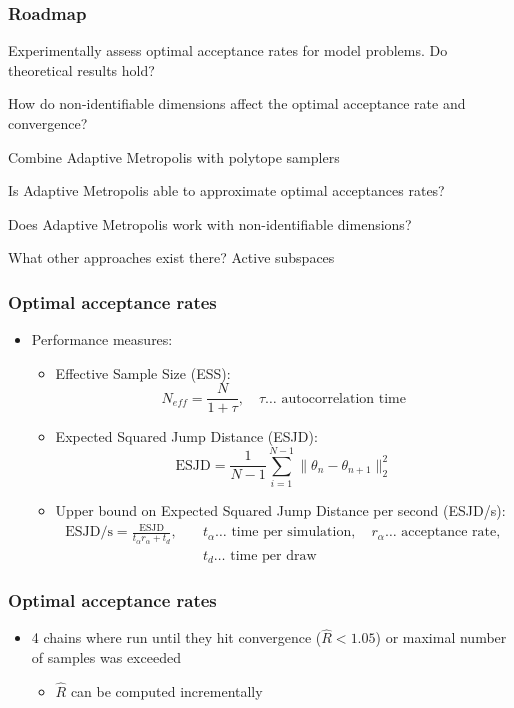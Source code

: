\begin{frame}[c]
    \frametitle{Roadmap}
    \begin{itemize}
	\item Experimentally assess optimal acceptance rates for model problems. Do theoretical results hold?
        {\color{lgray}
	\item How do non-identifiable dimensions affect the optimal acceptance rate and convergence?
	\item Combine Adaptive Metropolis with polytope samplers
	\item Is Adaptive Metropolis able to approximate optimal acceptances rates? 
	\item Does Adaptive Metropolis work with non-identifiable dimensions?
	\item What other approaches exist there? Active subspaces \cite{Constantine_2016}
    }
    \end{itemize}
\end{frame}

\begin{frame}[c]
    \frametitle{Optimal acceptance rates}
    \begin{itemize}
        \item Performance measures:
        \begin{itemize}
            \item Effective Sample Size (ESS): \[
                    N_{eff} = \frac{N}{1 + \tau}, \quad \tau \dots \text{ autocorrelation time}
                \]
            \item Expected Squared Jump Distance (ESJD): \[
                    \mathrm{ESJD} = \frac{1}{N-1} \sum_{i=1}^{N-1} \| \theta_n - \theta_{n+1} \|_2^2
                \]
            \item Upper bound on Expected Squared Jump Distance per second (ESJD/s): \begin{align*}
                \mathrm{ESJD/s} = \frac{\mathrm{ESJD}}{t_\alpha r_\alpha + t_d},
                    & \quad t_\alpha \dots \text{ time per simulation}, \quad r_\alpha \dots \text{ acceptance rate}, \\
                    & \quad t_d \dots \text{ time per draw}
            \end{align*}
        \end{itemize}
    \end{itemize}
\end{frame}

\begin{frame}[c]
    \frametitle{Optimal acceptance rates}
    \begin{itemize}
        \item 4 chains where run until they hit convergence ($\widehat{R} < 1.05$) or maximal number of samples was exceeded
        \begin{itemize}
            \item $\widehat{R}$ can be computed incrementally
        \end{itemize}
    \end{itemize}
\end{frame}

